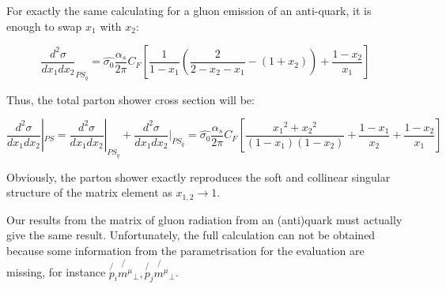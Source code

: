 For exactly the same calculating for a gluon emission of an anti-quark, it is enough to swap $ x_1 $ with $ x_2 $:

\begin{equation}
\frac{d^2 \sigma}{dx_1 dx_2}_{PS_{\bar{q}}}= \hat{\sigma_0}
\frac{\alpha_s}{2\pi} C_F [\frac{1}{1-x_1} (\frac{2}{2-x_2-x_1}-(1+x_2))+\frac{1-x_2}{x_1}]
\end{equation}

Thus, the total parton shower cross section will be:

\begin{equation}
\frac{d^2 \sigma}{dx_1 dx_2}|_{PS}=\frac{d^2 \sigma}{dx_1 dx_2}|_{PS_q}+\frac{d^2 \sigma}{dx_1 dx_2}|_{PS_{\bar{q}}}= \hat{\sigma_0}
\frac{\alpha_s}{2\pi} C_F [\frac{{x_1}^2+{x_2}^2}{(1-x_1)(1-x_2)}+\frac{1-x_1}{x_2}+\frac{1-x_2}{x_1}]
\end{equation}

Obviously, the parton shower exactly reproduces the soft and collinear singular structure of the matrix element as $ x_{1,2} \rightarrow 1 $.

Our results from the matrix of gluon radiation from an (anti)quark must actually give the same result. Unfortunately, the full calculation can not be obtained because some information from the parametrisation for the evaluation are missing, for instance $ \not{p_i} \not{m^{\mu}}_{\bot}, \not{p_j} \not{m^{\mu}}_{\bot} $. 